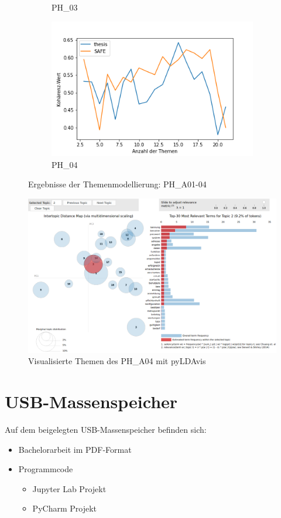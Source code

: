 \begin{figure}[!ht]
\begin{subfigure}[b]{0.495\textwidth}
         \caption{PH\_03}
         \label{fig:lda-a03}
     \end{subfigure}
     \hfill
     \begin{subfigure}[b]{0.495\textwidth}
         \centering
         \includegraphics[width=\textwidth]{media/cs_PH_A04.png}
         \caption{PH\_04}
         \label{fig:lda-a04}
     \end{subfigure}
    \caption{Ergebnisse der Themenmodellierung: PH\_A01-04}
    \label{app:figs:tmtopiccoherence-external}
\end{figure}

\begin{figure}
    \centering
    \includegraphics[width=\linewidth]{media/LDAVIZ_PH_A02.png}
    \caption{Visualisierte Themen des PH\_A04 mit pyLDAvis}
    \label{app:fig:lda_viz}
\end{figure}

\section{USB-Massenspeicher}

\vspace{0.5cm}

Auf dem beigelegten USB-Massenspeicher befinden sich:

\begin{itemize}
    \item Bachelorarbeit im PDF-Format
    \item Programmcode
    \begin{itemize}
        \item Jupyter Lab Projekt
        \item PyCharm Projekt
    \end{itemize}
\end{itemize}
